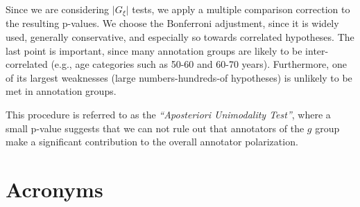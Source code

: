 \documentclass{article}
\begin{document}
Since we are considering $\lvert G_{\xi} \rvert$ tests, we apply a multiple comparison correction to the resulting p-values. We choose the Bonferroni adjustment, since it is widely used, generally conservative, and especially so towards correlated hypotheses. The last point is important, since many annotation groups are likely to be inter-correlated (e.g., age categories such as 50-60 and 60-70 years). Furthermore, one of its largest weaknesses (large numbers-hundreds-of hypotheses) is unlikely to be met in annotation groups.

This procedure is referred to as the \textit{``Aposteriori Unimodality Test''}, where a small p-value suggests that we can not rule out that annotators of the $g$ group make a significant contribution to the overall annotator polarization.


\section{Acronyms}

\begin{acronym}[WWW]
\end{acronym}
\end{document}
